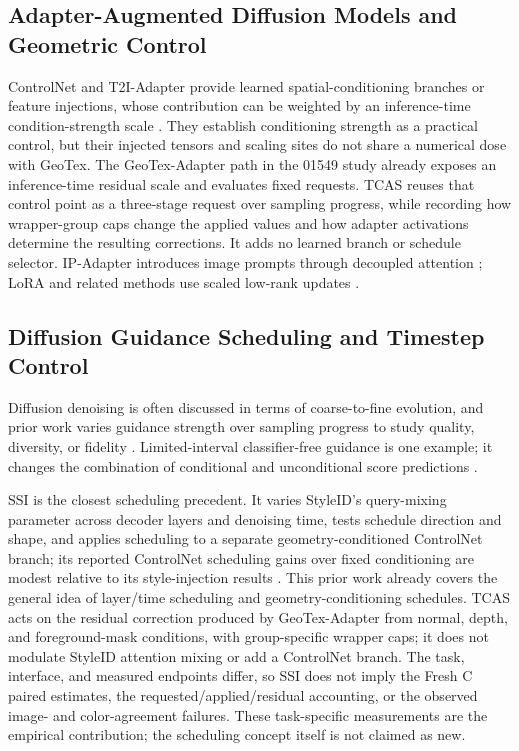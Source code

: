 \documentclass[times,twocolumn,final]{elsarticle}
\begin{document}
\subsection{Adapter-Augmented Diffusion Models and Geometric Control}
\label{subsec:adapter}

ControlNet and T2I-Adapter provide learned spatial-conditioning branches or feature injections, whose contribution can be weighted by an inference-time condition-strength scale \cite{mou2023t2iadapter,zhang2023controlnet}. They establish conditioning strength as a practical control, but their injected tensors and scaling sites do not share a numerical dose with GeoTex. The GeoTex-Adapter path in the 01549 study already exposes an inference-time residual scale and evaluates fixed requests. TCAS reuses that control point as a three-stage request over sampling progress, while recording how wrapper-group caps change the applied values and how adapter activations determine the resulting corrections. It adds no learned branch or schedule selector. IP-Adapter introduces image prompts through decoupled attention \cite{ye2023ipadapter}; LoRA and related methods use scaled low-rank updates \cite{hu2022lora,liu2024dora,zhang2023adalora}.

\subsection{Diffusion Guidance Scheduling and Timestep Control}
\label{subsec:guidance}

Diffusion denoising is often discussed in terms of coarse-to-fine evolution, and prior work varies guidance strength over sampling progress to study quality, diversity, or fidelity \cite{ho2020ddpm,song2021ddim,ho2022cfg,castillo2023adaptive}. Limited-interval classifier-free guidance is one example; it changes the combination of conditional and unconditional score predictions \cite{kynkanniemi2024limited}.

SSI is the closest scheduling precedent. It varies StyleID's query-mixing parameter across decoder layers and denoising time, tests schedule direction and shape, and applies scheduling to a separate geometry-conditioned ControlNet branch; its reported ControlNet scheduling gains over fixed conditioning are modest relative to its style-injection results \cite{kulkarni2026ssi}. This prior work already covers the general idea of layer/time scheduling and geometry-conditioning schedules. TCAS acts on the residual correction produced by GeoTex-Adapter from normal, depth, and foreground-mask conditions, with group-specific wrapper caps; it does not modulate StyleID attention mixing or add a ControlNet branch. The task, interface, and measured endpoints differ, so SSI does not imply the Fresh C paired estimates, the requested/applied/residual accounting, or the observed image- and color-agreement failures. These task-specific measurements are the empirical contribution; the scheduling concept itself is not claimed as new.
\end{document}
